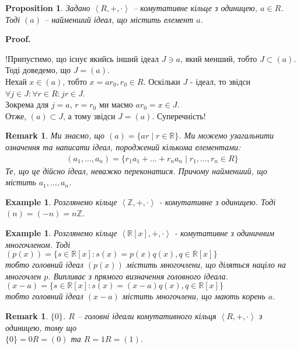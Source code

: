 \documentclass[a4paper, 10pt]{article}
\makeatletter
\theoremstyle{theoremdd}
\theoremstyle{theoremdd}
\theoremstyle{theoremdd}
\theoremstyle{theoremdd}
\theoremstyle{theoremdd}
\newtheorem{example}[theorem]{Example}
\theoremstyle{theoremdd}
\theoremstyle{theoremdd}
\theoremstyle{theoremdd}
\theoremstyle{theoremdd}
\newtheorem{proposition}[theorem]{Proposition}
\theoremstyle{theoremdd}
\theoremstyle{theoremdd}
\newtheorem{remark}[theorem]{Remark}
\theoremstyle{theoremdd}
\theoremstyle{theoremdd}
\theoremstyle{theoremdd}
\theoremstyle{theoremdd}
\renewenvironment{proof}[1][Proof.\\]{\par
\pushQED{\hfill \qed}%
\normalfont \topsep6\p@\@plus6\p@\relax
\trivlist
\item\relax
{\bfseries
#1\@addpunct{.}}\hspace\labelsep\ignorespaces
}{%
\popQED\endtrivlist\@endpefalse
}
\makeatother
\begin{document}
\begin{proposition}
Задано $\left<R,+,\cdot \right>$ -- комутативне кільце з одиницею, $a \in R$. Тоді $(a)$ -- найменший ідеал, що містить елемент $a$.
\end{proposition}

\begin{proof}
!Припустимо, що існує якийсь інший ідеал $J \ni a$, який менший, тобто $J \subset (a)$. Тоді доведемо, що $J = (a)$.\\
Нехай $x \in (a)$, тобто $x = ar_0, r_0 \in R$. Оскільки $J$ - ідеал, то звідси $\forall j \in J: \forall r \in R: jr \in J$.\\
Зокрема для $j = a$, $r = r_0$ ми маємо $ar_0 = x \in J$.\\
Отже, $(a) \subset J$, а тому звідси $J = (a)$. Суперечність!
\end{proof}

\begin{remark}
Ми знаємо, що $(a) = \{ ar \mid r \in \mathbb{R} \}$. Ми можемо узагальнити означення та написати ідеал, породжений кількома елементами:
\begin{align*}
(a_1,\dots,a_n) = \{r_1 a_1 + \dots + r_n a_n \mid r_1,\dots,r_n \in R\}
\end{align*}
Те, що це дійсно ідеал, неважко переконатися. Причому найменший, що містить $a_1,\dots,a_n$.
\end{remark}

\begin{example}
Розглянемо кільце $\left< \mathbb{Z},+,\cdot \right>$ - комутативне з одиницею. Тоді $(n) = (-n) = n \mathbb{Z}$.
\end{example}

\begin{example}
Розглянемо кільце $\left<\mathbb{R}[x],+,\cdot \right>$ - комутативне з одиничним многочленом. Тоді\\
$(p(x)) = \{s \in \mathbb{R}[x]: s(x) = p(x)q(x), q \in \mathbb{R}[x] \}$\\
тобто головний ідеал $(p(x))$ містить многочлени, що діляться націло на многочлен $p$. Випливає з прямого визначення головного ідеала.\\
$(x-a) = \{s \in \mathbb{R}[x]: s(x) = (x-a)q(x), q \in \mathbb{R}[x]\}$\\
тобто головний ідеал $(x-a)$ містить многочлени, що мають корень $a$.
\end{example}

\begin{remark}
$\{0\}$. $R$ -- головні ідеали комутативного кільця $\left<R,+,\cdot\right>$ з одиницею, тому що\\
$\{0\} = 0R = (0)$ та $R = 1R = (1)$.
\end{remark}
\end{document}
